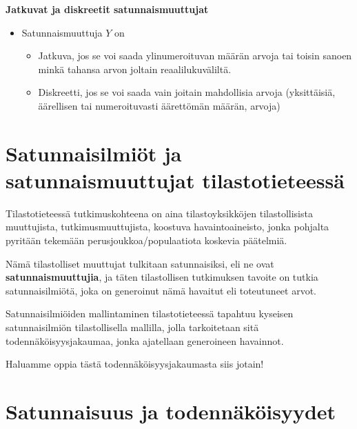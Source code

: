 \documentclass[
]{report}
\begin{document}
\begin{defblock}{}

\textbf{Jatkuvat ja diskreetit satunnaismuuttujat}

\begin{itemize}
\item
  Satunnaismuuttuja \(Y\) on

  \begin{itemize}
  \item
    Jatkuva, jos se voi saada ylinumeroituvan määrän arvoja tai toisin
    sanoen minkä tahansa arvon joltain reaalilukuväliltä.
  \item
    Diskreetti, jos se voi saada vain joitain mahdollisia arvoja
    (yksittäisiä, äärellisen tai numeroituvasti äärettömän määrän,
    arvoja)
  \end{itemize}
\end{itemize}

\end{defblock}

\hypertarget{satunnaisilmiuxf6t-ja-satunnaismuuttujat-tilastotieteessuxe4}{%
\section{Satunnaisilmiöt ja satunnaismuuttujat
tilastotieteessä}\label{satunnaisilmiuxf6t-ja-satunnaismuuttujat-tilastotieteessuxe4}}

Tilastotieteessä tutkimuskohteena on aina tilastoyksikköjen
tilastollisista muuttujista, tutkimusmuuttujista, koostuva
havaintoaineisto, jonka pohjalta pyritään tekemään
perusjoukkoa/populaatiota koskevia päätelmiä.

Nämä tilastolliset muuttujat tulkitaan satunnaisiksi, eli ne ovat
\textbf{satunnaismuuttujia}, ja täten tilastollisen tutkimuksen tavoite
on tutkia satunnaisilmiötä, joka on generoinut nämä havaitut eli
toteutuneet arvot.

Satunnaisilmiöiden mallintaminen tilastotieteessä tapahtuu kyseisen
satunnaisilmiön tilastollisella mallilla, jolla tarkoitetaan sitä
todennäköisyysjakaumaa, jonka ajatellaan generoineen havainnot.

Haluamme oppia tästä todennäköisyysjakaumasta siis jotain!

\hypertarget{satunnaisuus-ja-todennuxe4kuxf6isyydet}{%
\section{Satunnaisuus ja
todennäköisyydet}\label{satunnaisuus-ja-todennuxe4kuxf6isyydet}}
\end{document}
